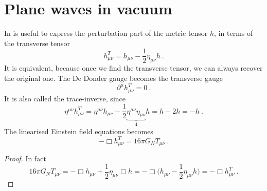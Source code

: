 \section{Plane waves in vacuum} 

    In is useful to express the perturbation part of the metric tensor $h$, in terms of the transverse tensor 
    \begin{equation*}
        h^T_{\mu\nu} = h_{\mu\nu} - \frac{1}{2} \eta_{\mu\nu} h ~.
    \end{equation*}
    It is equivalent, because once we find the transverse tensor, we can always recover the original one. The De Donder gauge becomes the transverse gauge
    \begin{equation*}
        \partial^\mu h^T_{\mu\nu} = 0 ~.
    \end{equation*}
    It is also called the trace-inverse, since 
    \begin{equation*}
        \eta^{\mu\nu} h^T_{\mu\nu} = \eta^{\mu\nu} h_{\mu\nu} - \frac{1}{2} \underbrace{\eta^{\mu\nu} \eta_{\mu\nu}}_4 h = h - 2 h = - h ~.
    \end{equation*}
    The linearised Einstein field equations becomes
    \begin{equation*}
        - \Box h^T_{\mu\nu} = 16 \pi G_N T_{\mu\nu} ~.
    \end{equation*}
    \begin{proof}
        In fact
        \begin{equation*}
            16 \pi G_N T_{\mu\nu} = - \Box h_{\mu\nu} + \frac{1}{2} \eta_{\mu\nu} \Box h = - \Box \Big ( h_{\mu\nu} - \frac{1}{2} \eta_{\mu\nu} h \Big ) = - \Box h^T_{\mu\nu} ~.
        \end{equation*}
    \end{proof}

